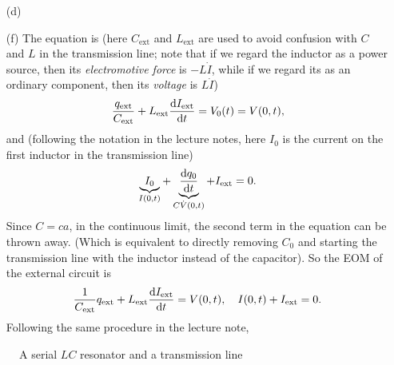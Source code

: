 \documentclass[hyperref, a4paper]{article}
\begin{document}
\begin{itemize}
\item[(d)] 
\item[(f)] The equation is 
(here $C_{\text{ext}}$ and $L_{\text{ext}}$ are used to avoid confusion with $C$ and $L$ in the transmission line;
note that if we regard the inductor as a power source, 
then its \emph{electromotive force} is $- L \dot{I}$,
while if we regard its as an ordinary component,
then its \emph{voltage} is $L \dot{I}$)
\begin{equation}
    \frac{q_{\text{ext}}}{C_{\text{ext}}} + L_{\text{ext}} \dv{I_{\text{ext}}}{t} = V_0(t) = V(0, t),
\end{equation}
and (following the notation in the lecture notes,
here $I_0$ is the current on the first inductor in the transmission line)
\begin{equation}
    \underbrace{I_0}_{I(0, t)} + \underbrace{\dv{q_0}{t}}_{C \dot{V}(0, t)} + I_{\text{ext}} = 0.
\end{equation}
Since $C = ca$, in the continuous limit, the second term in the equation can be thrown away.
(Which is equivalent to directly removing $C_0$ and starting the transmission line with 
the inductor instead of the capacitor).
So the EOM of the external circuit is 
\begin{equation}
    \frac{1}{C_{\text{ext}}} q_{\text{ext}} + L_{\text{ext}} \dv{I_{\text{ext}}}{t} = V(0, t),
    \quad I(0, t) + I_{\text{ext}} = 0.
\end{equation}
Following the same procedure in the lecture note,



\end{itemize}

\begin{figure}
    \centering
    
    \caption{A serial $LC$ resonator and a transmission line}
    \label{fig:transmission-load}
\end{figure}
\end{document}
